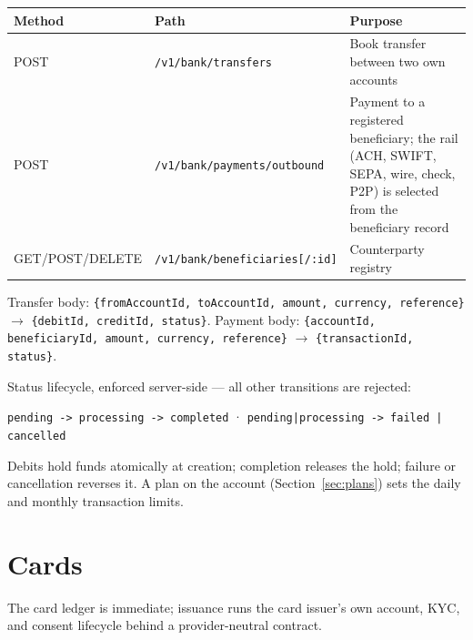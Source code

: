 \documentclass[11pt]{article}
\newcommand{\ep}[1]{\texttt{\small #1}}
\begin{document}
\begin{table}[H]
\centering
\small
\begin{tabular}{@{}llp{7cm}@{}}
\toprule
\textbf{Method} & \textbf{Path} & \textbf{Purpose} \\
\midrule
POST & \ep{/v1/bank/transfers} & Book transfer between two own accounts \\
POST & \ep{/v1/bank/payments/outbound} & Payment to a registered beneficiary; the rail (ACH, SWIFT, SEPA, wire, check, P2P) is selected from the beneficiary record \\
GET/POST/DELETE & \ep{/v1/bank/beneficiaries[/:id]} & Counterparty registry \\
\bottomrule
\end{tabular}
\end{table}

Transfer body: \ep{\{fromAccountId, toAccountId, amount, currency,
reference\}} $\rightarrow$ \ep{\{debitId, creditId, status\}}.
Payment body: \ep{\{accountId, beneficiaryId, amount, currency,
reference\}} $\rightarrow$ \ep{\{transactionId, status\}}.

Status lifecycle, enforced server-side --- all other transitions are
rejected:

\begin{center}
\ep{pending -> processing -> completed} \quad · \quad
\ep{pending|processing -> failed | cancelled}
\end{center}

Debits hold funds atomically at creation; completion releases the
hold; failure or cancellation reverses it. A plan on the account
(Section~\ref{sec:plans}) sets the daily and monthly transaction
limits.

\section{Cards}

The card ledger is immediate; issuance runs the card issuer's own
account, KYC, and consent lifecycle behind a provider-neutral
contract.
\end{document}
